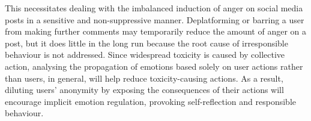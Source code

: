 \documentclass[acmtog]{acmart}
\begin{document}
This necessitates dealing with the imbalanced induction of anger on social media posts in a sensitive and non-suppressive manner. Deplatforming or barring a user from making further comments may temporarily reduce the amount of anger on a post, but it does little in the long run because the root cause of irresponsible behaviour is not addressed. Since widespread toxicity is caused by collective action, analysing the propagation of emotions based solely on user actions rather than users, in general, will help reduce toxicity-causing actions. As a result, diluting users' anonymity by exposing the consequences of their actions will encourage implicit emotion regulation, provoking self-reflection and responsible behaviour.



\begin{table}[]
\caption{Comparison of proposed framework against Perspective API \cite{bworld}}
\label{tab:my-table}
\end{table}
\end{document}
